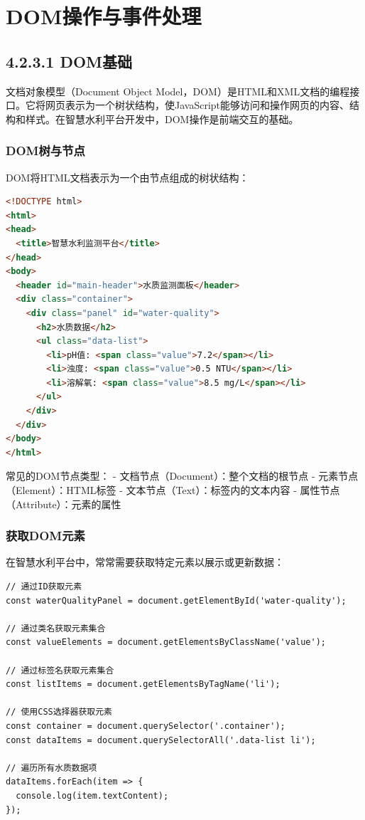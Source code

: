 \section{DOM操作与事件处理}\label{domux64cdux4f5cux4e0eux4e8bux4ef6ux5904ux7406}

\subsection{4.2.3.1 DOM基础}\label{domux57faux7840}

文档对象模型（Document Object
Model，DOM）是HTML和XML文档的编程接口。它将网页表示为一个树状结构，使JavaScript能够访问和操作网页的内容、结构和样式。在智慧水利平台开发中，DOM操作是前端交互的基础。

\subsubsection{DOM树与节点}\label{domux6811ux4e0eux8282ux70b9}

DOM将HTML文档表示为一个由节点组成的树状结构：

\begin{lstlisting}[language=HTML]
<!DOCTYPE html>
<html>
<head>
  <title>智慧水利监测平台</title>
</head>
<body>
  <header id="main-header">水质监测面板</header>
  <div class="container">
    <div class="panel" id="water-quality">
      <h2>水质数据</h2>
      <ul class="data-list">
        <li>pH值: <span class="value">7.2</span></li>
        <li>浊度: <span class="value">0.5 NTU</span></li>
        <li>溶解氧: <span class="value">8.5 mg/L</span></li>
      </ul>
    </div>
  </div>
</body>
</html>
\end{lstlisting}

常见的DOM节点类型： - 文档节点（Document）：整个文档的根节点 -
元素节点（Element）：HTML标签 - 文本节点（Text）：标签内的文本内容 -
属性节点（Attribute）：元素的属性

\subsubsection{获取DOM元素}\label{ux83b7ux53d6domux5143ux7d20}

在智慧水利平台中，常常需要获取特定元素以展示或更新数据：

\begin{lstlisting}
// 通过ID获取元素
const waterQualityPanel = document.getElementById('water-quality');

// 通过类名获取元素集合
const valueElements = document.getElementsByClassName('value');

// 通过标签名获取元素集合
const listItems = document.getElementsByTagName('li');

// 使用CSS选择器获取元素
const container = document.querySelector('.container');
const dataItems = document.querySelectorAll('.data-list li');

// 遍历所有水质数据项
dataItems.forEach(item => {
  console.log(item.textContent);
});
\end{lstlisting}


